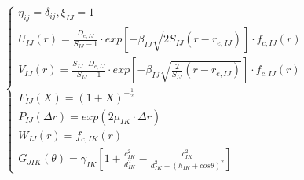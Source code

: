 \documentclass[12pt]{article}
\begin{document}
\begin{eqnarray*}
\left\{\begin{array}{l}
\eta_{ij}=\delta_{ij},\xi_{IJ}=1 \\
U_{IJ}\left(r\right)=\frac{D_{e,IJ}}{S_{IJ}-1}\cdot exp\left[-\beta_{IJ}\sqrt{2S_{IJ}\left(r-r_{e,IJ}\right)}\right]\cdot f_{c,IJ}\left(r\right) \\
V_{IJ}\left(r\right)=\frac{S_{IJ}\cdot D_{e,IJ}}{S_{IJ}-1}\cdot exp\left[-\beta_{IJ}\sqrt{\frac{2}{S_{IJ}}\left(r-r_{e,IJ}\right)}\right]\cdot f_{c,IJ}\left(r\right) \\
F_{IJ}\left(X\right)=\left(1+X\right)^{-\frac{1}{2}} \\
P_{IJ}\left(\Delta r\right)=exp\left(2\mu_{IK}\cdot \Delta r\right) \\ 
W_{IJ}\left(r\right)=f_{c,IK}\left(r\right) \\
G_{JIK}\left(\theta\right)=\gamma_{IK}\left[1+\frac{c_{IK}^2}{d_{IK}^2}-\frac{c_{IK}^2}{d_{IK}^2+\left(h_{IK}+cos\theta\right)^2}\right]
\end{array}\right.
\end{eqnarray*} 
\end{document}
